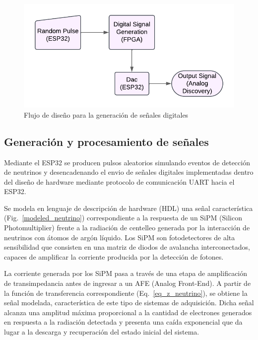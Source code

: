         \begin{figure}[H]
        \centerline{\includegraphics[scale=0.2]{diagrama_montaje_pulso.png}}
        \caption{Flujo de diseño para la generación de señales digitales}
        \label{flujo_de_diseño}
        \end{figure}



    \vspace{0.3cm}
   \subsection{Generación y procesamiento de señales}
    
    Mediante el ESP32 se producen pulsos aleatorios simulando eventos de detección de neutrinos y desencadenando el envio de señales digitales implementadas dentro del diseño de hardware mediante protocolo de comunicación UART hacia el ESP32.
        
    Se modela en lenguaje de descripción de hardware (HDL) una señal característica (Fig.~\ref{modeled_neutrino}) correspondiente a la respuesta de un SiPM (Silicon Photomultiplier) frente a la radiación de centelleo generada por la interacción de neutrinos con átomos de argón líquido. Los SiPM son fotodetectores de alta sensibilidad que consisten en una matriz de diodos de avalancha interconectados, capaces de amplificar la corriente producida por la detección de fotones.

    La corriente generada por los SiPM pasa a través de una etapa de amplificación de transimpedancia antes de ingresar a un AFE (Analog Front-End). A partir de la función de transferencia correspondiente (Eq.~\ref{eq_z_neutrino}), se obtiene la señal modelada, característica de este tipo de sistemas de adquisición. Dicha señal alcanza una amplitud máxima proporcional a la cantidad de electrones generados en respuesta a la radiación detectada y presenta una caída exponencial que da lugar a la descarga y recuperación del estado inicial del sistema.

